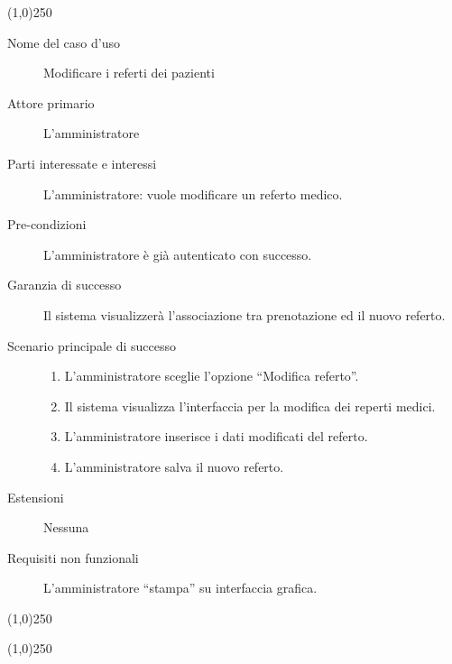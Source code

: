 \begin{center}
\line(1,0){250}
\end{center}


\begin{description}
\item[Nome del caso d'uso]
       	Modificare i referti dei pazienti

\item[Attore primario]
        L'amministratore

\item[Parti interessate e interessi]
        L'amministratore: vuole modificare un referto medico.

\item[Pre-condizioni]
	L'amministratore è già autenticato con successo.

\item[Garanzia di successo]
        Il sistema visualizzerà l'associazione tra prenotazione ed il nuovo 
        referto.

\item[Scenario principale di successo]
\begin{enumerate}
\item L'amministratore sceglie l'opzione ``Modifica referto''.
\item Il sistema visualizza l'interfaccia per la modifica dei reperti medici.
\item L'amministratore inserisce i dati modificati del referto.
\item L'amministratore salva il nuovo referto.

\end{enumerate}

\item[Estensioni]
	Nessuna


\item[Requisiti non funzionali]
\begin{itemize}
\diam L'amministratore ``stampa'' su interfaccia grafica.
\end{itemize}
\end{description}



\begin{center}
\line(1,0){250}
\end{center}


\begin{center}
\line(1,0){250}
\end{center}



